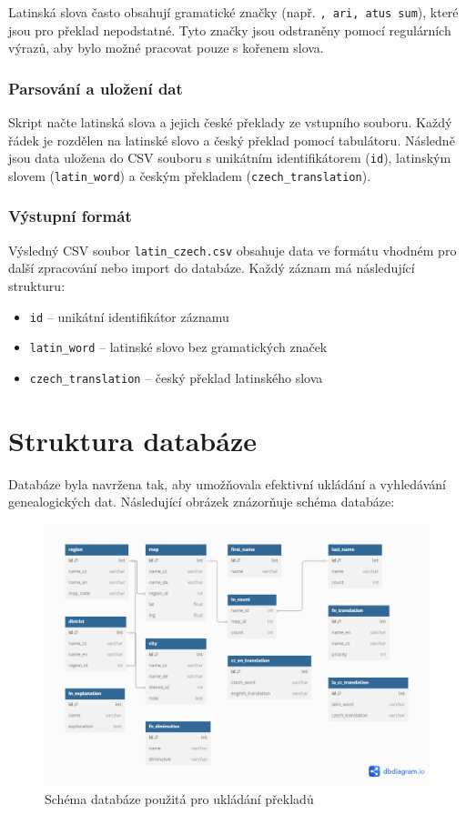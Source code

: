 \documentclass[czech, ba, kiv, he]{fasthesis}
\begin{document}
Latinská slova často obsahují gramatické značky (např. \texttt{, ari, atus sum}), které jsou pro překlad nepodstatné. Tyto značky jsou odstraněny pomocí regulárních výrazů, aby bylo možné pracovat pouze s kořenem slova.

\subsubsection*{Parsování a uložení dat}

Skript načte latinská slova a jejich české překlady ze vstupního souboru. Každý řádek je rozdělen na latinské slovo a český překlad pomocí tabulátoru. Následně jsou data uložena do CSV souboru s unikátním identifikátorem (\texttt{id}), latinským slovem (\texttt{latin\_word}) a českým překladem (\texttt{czech\_translation}).


\subsubsection*{Výstupní formát}

Výsledný CSV soubor \texttt{latin\_czech.csv} obsahuje data ve formátu vhodném pro další zpracování nebo import do databáze. Každý záznam má následující strukturu:

\begin{itemize}
\item \texttt{id} – unikátní identifikátor záznamu
\item \texttt{latin\_word} – latinské slovo bez gramatických značek
\item \texttt{czech\_translation} – český překlad latinského slova
\end{itemize}

\newpage

\section{Struktura databáze}


Databáze byla navržena tak, aby umožňovala efektivní ukládání a vyhledávání genealogických dat. Následující obrázek znázorňuje schéma databáze:

\begin{figure}[h]
\centering
\includegraphics[width=1\textwidth]{database.png}
\caption{Schéma databáze použitá pro ukládání překladů}
\end{figure}
\end{document}
